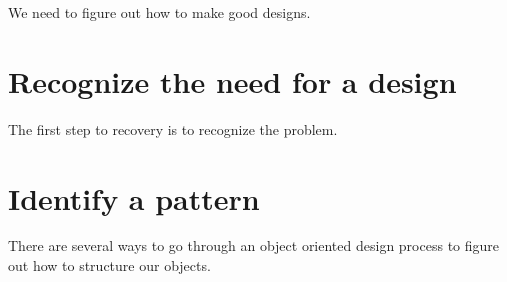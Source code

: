 
We need to figure out how to make good designs.

    \section{Recognize the need for a design}

The first step to recovery is to recognize the problem.

    \section{Identify a pattern} 

There are several ways to go through an object oriented design
process to figure out how to structure our objects.
